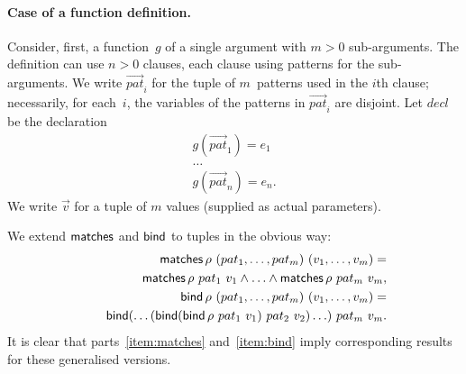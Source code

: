 
\paragraph{Case of a function definition.}

Consider, first, a function~$g$ of a single argument with $m>0$ sub-arguments.
The definition can use $n>0$ clauses, each clause using patterns for the
sub-arguments.  We write $\vec{pat}_i$ for the tuple of $m$~patterns used in
the $i$th clause; necessarily, for each~$i$, the variables of the patterns in
$\vec{pat}_i$ are disjoint.  Let $decl$ be the declaration
\[
\begin{array}{c}
g(\vec{pat}_1) = e_1 \\
\ldots \\
g(\vec{pat}_n) = e_n.
\end{array}
\]
We write $\vec{v}$ for a tuple of $m$ values (supplied as actual parameters).

We extend $\mathop{\sf matches}$ and $\mathop{\sf bind}\nolimits$ to tuples in the obvious way:
\[
\begin{align}
\mathop{\sf matches} \rho~(pat_1,\ldots,pat_m)~(v_1,\ldots, v_m)  = \\
\qquad  \mathop{\sf matches} \rho~pat_1~v_1 \land \ldots \land \mathop{\sf matches} \rho~pat_m~v_m, \\
\mathop{\sf bind}\nolimits \rho~(pat_1,\ldots,pat_m)~(v_1,\ldots, v_m)  = \\
\qquad  \mathop{\sf bind}\nolimits(\ldots(\mathop{\sf bind}\nolimits (\mathop{\sf bind}\nolimits \rho~pat_1~v_1)~pat_2~v_2)\ldots)~pat_m~v_m.
\end{align}
\]
It is clear that parts~\ref{item:matches} and~\ref{item:bind} imply
corresponding results for these generalised versions.  

